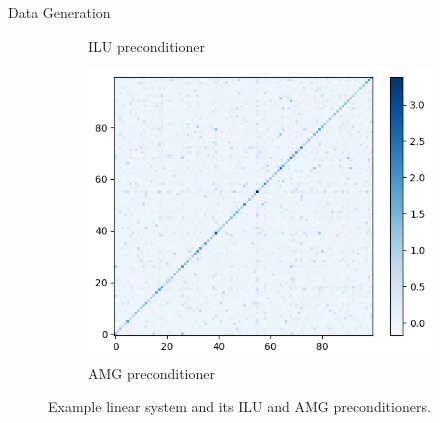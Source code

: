 \documentclass[aspectratio=169]{beamer}
\begin{document}
\begin{frame}{Data Generation}
\begin{figure}
\begin{subfigure}{0.3\textwidth}
            \caption{ILU preconditioner}
        \end{subfigure}
        \begin{subfigure}{0.3\textwidth} 
            \centering
            \includegraphics[width=\linewidth]{./figures/example-amg.png}
            \caption{AMG preconditioner}
        \end{subfigure}
        \caption{Example linear system and its ILU and AMG preconditioners.}
        \label{fig:spd_mat}
    \end{figure}
\end{frame}
\end{document}
